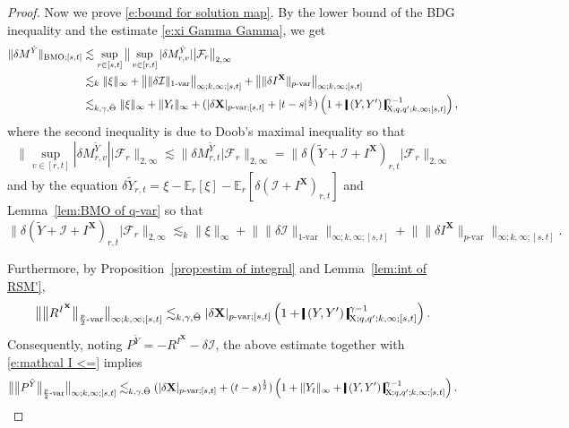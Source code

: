 \documentclass[11pt,reqno]{amsart}
\numberwithin{equation}{section}
\def\E{\mathbb E}
\newcommand{\shortthickbar}{%
  \vcenter{\hbox{\rule{1.8pt}{2.2ex}}}%
}
\newcommand{\thicknm}[1]{%
  \mathopen{\shortthickbar}%
  \mkern4mu #1 \mkern4mu%
  \mathclose{\shortthickbar}%
}
\begin{document}
\begin{proof}
Now we prove \eqref{e:bound for solution map}. By the lower bound of the BDG inequality and the estimate \eqref{e:xi Gamma Gamma}, we get 
\begin{align}\nonumber
\|\delta M^{\tilde Y}\|_{\mathrm{BMO};[s,t]} &\lesssim \sup_{r \in [s,t]} \big\|  \sup_{v\in[r,t]} |\delta M^{\tilde Y}_{r,v}| \big|\mathcal F_{r} \big\|_{2,\infty} \\ \label{e:M^Y BMO <= sup}
&\lesssim_k \|\xi\|_{\infty} + \big\| \|\delta \mathcal I\|_{1\text{-}\mathrm{var}} \big\|_{\infty;k,\infty;[s,t]} + \big\| \| \delta I^{\mathbf X}\|_{p\text{-}\mathrm{var}} \big\|_{\infty;k,\infty;[s,t]} \\ \nonumber
&\lesssim_{k,\gamma,\bar \Theta} 
\|\xi\|_{\infty} +  \|Y_t\|_{\infty}
+ (|\delta \mathbf X|_{p\text{-}\mathrm{var};[s,t]} + |t - s|^{\frac{1}{2}}) \left( 1 + \thicknm{(Y,Y')}^{\gamma - 1}_{\mathrm X;q,q';k,\infty;[s,t]} \right), 
\end{align}
where the second inequality is due to Doob's maximal inequality so that  
\begin{equation*}
\big\|\sup_{v \in [r,t]} |\delta M^{\tilde Y}_{r,v}| \big| \mathcal F_r \big\|_{2,\infty} \lesssim \big\| \delta M^{\tilde Y}_{r,t} \big| \mathcal F_r \big\|_{2,\infty} = \big\|\delta (\tilde Y + \mathcal I + I^{\mathbf X})_{r,t} \big| \mathcal F_r \big\|_{2,\infty} 
\end{equation*}
and by the equation $\delta \tilde Y_{r,t} = \xi - \E_{r}[\xi] - \E_{r}[\delta (\mathcal I + I^{\mathbf X})_{r,t}]$ and Lemma~\ref{lem:BMO of q-var} so that 
\begin{equation*}
\big\|\delta (\tilde Y + \mathcal I + I^{\mathbf X})_{r,t} \big| \mathcal F_r \big\|_{2,\infty} \lesssim_k \|\xi\|_{\infty} + \big\| \|\delta \mathcal I\|_{1\text{-}\mathrm{var}} \big\|_{\infty;k,\infty;[s,t]} + \big\| \| \delta I^{\mathbf X}\|_{p\text{-}\mathrm{var}} \big\|_{\infty;k,\infty;[s,t]}.
\end{equation*}

Furthermore, by Proposition~\ref{prop:estim of integral} and Lemma~\ref{lem:int of RSM'}, 
\begin{equation*}
\begin{aligned}
\big\| \big\|R^{I^{\mathbf X}} \big\|_{\frac{p}{2}\text{-var}} \big\|_{\infty;k,\infty;[s,t]} \lesssim_{k,\gamma,\bar \Theta} |\delta \mathbf X|_{p\text{-}\mathrm{var};[s,t]} \left( 1 + \thicknm{(Y,Y')}^{\gamma - 1}_{\mathrm X;q,q';k,\infty;[s,t]} \right). 
\end{aligned}
\end{equation*}
Consequently, noting $P^{\tilde Y} = - R^{I^{\mathbf X}} - \delta \mathcal I$, the above estimate together with \eqref{e:mathcal I <=} implies   
\begin{equation}\label{e:R^J tilde Y}
\big\| \big\|P^{\tilde Y} \big\|_{\frac{p}{2}\text{-var}} \big\|_{\infty;k,\infty;[s,t]} \lesssim_{k,\gamma,\bar \Theta} (|\delta \mathbf X|_{p\text{-}\mathrm{var};[s,t]} + (t-s)^{\frac{1}{2}}) \left( 1 +  \|Y_t\|_{\infty}  + \thicknm{(Y,Y')}^{\gamma - 1}_{\mathrm X;q,q';k,\infty;[s,t]} \right).  
\end{equation}


\end{proof}
\end{document}

